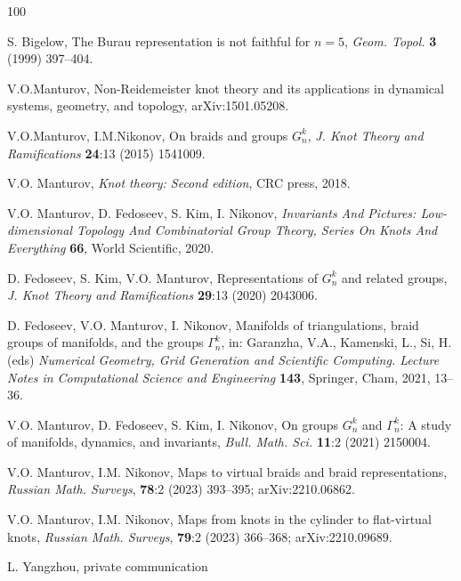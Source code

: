 \documentclass{article}
\theoremstyle{definition}
\begin{document}
\begin{thebibliography} {100}

 S. Bigelow, The Burau representation is not faithful for $n=5$, \emph{Geom. Topol.} {\bf 3} (1999) 397--404.

V.O.Manturov, Non-Reidemeister knot theory and its applications in dynamical systems, geometry, and topology, arXiv:1501.05208.

V.O.Manturov, I.M.Nikonov, On braids and groups $G_{n}^{k}$, \emph{J. Knot Theory and Ramifications} {\bf 24}:13 (2015) 1541009.

 V.O. Manturov, \emph{Knot theory: Second edition}, CRC press, 2018.

 V.O. Manturov, D. Fedoseev, S. Kim, I. Nikonov,  {\em Invariants And Pictures: Low-dimensional Topology And Combinatorial Group Theory, Series On Knots And Everything} {\bf 66}, World Scientific, 2020.

 D. Fedoseev, S. Kim, V.O. Manturov, Representations of $G^k_n$ and related groups, \emph{J. Knot Theory and Ramifications} {\bf 29}:13 (2020) 2043006.

 D. Fedoseev, V.O. Manturov, I. Nikonov, Manifolds of triangulations, braid groups of manifolds, and the groups $\Gamma_n^k$, in: Garanzha, V.A., Kamenski, L., Si, H. (eds) \emph{Numerical Geometry, Grid Generation and Scientific Computing. Lecture Notes in Computational Science and Engineering} {\bf 143}, Springer, Cham, 2021, 13--36.

 V.O. Manturov, D. Fedoseev, S. Kim, I. Nikonov, On groups $G_n^k$ and $\Gamma_n^k$: A study of manifolds, dynamics, and invariants, \emph{Bull. Math. Sci.} {\bf 11}:2 (2021) 2150004.

V.O. Manturov, I.M. Nikonov, Maps to virtual braids and braid representations, \emph{Russian Math. Surveys}, {\bf 78}:2 (2023) 393--395; arXiv:2210.06862.

V.O. Manturov, I.M. Nikonov, Maps from knots in the cylinder to flat-virtual knots, \emph{Russian Math. Surveys}, {\bf 79}:2 (2023) 366–368; arXiv:2210.09689.


 L. Yangzhou, private communication





\end{thebibliography}
\end{document}
